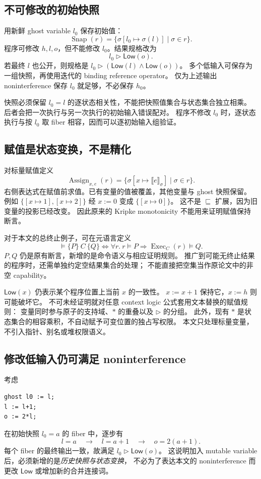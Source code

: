\documentclass[UTF8,a4paper,11pt,fontset=fandol]{ctexart}
\newcommand{\Low}{\mathsf{Low}}
\newcommand{\Exec}{\operatorname{Exec}}
\newcommand{\sat}{\models}
\newcommand{\eqv}{\Longleftrightarrow}
\begin{document}
\subsection{不可修改的初始快照}
用新鲜 ghost variable $l_0$ 保存初始值：
\[
 \operatorname{Snap}(r)=
 \{\sigma[l_0\mapsto\sigma(l)]\mid\sigma\in r\}.
\]
程序可修改 $h,l,o$，但不能修改 $l_0$。结果规格改为
\[
 \boxed{l_0\triangleright\Low(o).}
\]
若最终 $l$ 也公开，则规格是
$l_0\triangleright(\Low(l)\land\Low(o))$。
多个低输入可保存为一组快照，再使用迭代的 binding reference operator。
仅为上述输出 noninterference 保存 $l_0$ 就足够，不必保存 $h_0$。

快照必须保留 $l_0=l$ 的逐状态相关性，不能把快照值集合与状态集合独立相乘。
后者会把一次执行与另一次执行的初始输入错误配对。
程序不修改 $l_0$ 时，逐状态执行与按 $l_0$ 取 fiber 相容，因而可以逐初始输入组验证。

\subsection{赋值是状态变换，不是精化}
对标量赋值定义
\[
 \operatorname{Assign}_{x,e}(r)=
 \{\sigma[x\mapsto\llbracket e\rrbracket_\sigma]\mid\sigma\in r\}.
\]
右侧表达式在赋值前求值。已有变量的值被覆盖，其他变量与 ghost 快照保留。
例如 $\{[x\mapsto1],[x\mapsto2]\}$ 经 $x:=0$ 变成 $\{[x\mapsto0]\}$。
这不是 $\sqsubseteq$ 扩展，因为旧变量的投影已经改变。
因此原来的 Kripke monotonicity 不能用来证明赋值保持断言。

对于本文的总终止例子，可在元语言定义
\[
 \sat\{P\}\ C\ \{Q\}
 \eqv
 \forall r.\ r\sat P\Longrightarrow\Exec_C(r)\sat Q.
\]
$P,Q$ 仍是原有断言，新增的是命令语义与相应证明规则。
推广到可能无终止结果的程序时，还需单独约定空结果集合的处理；
不能直接把空集当作原论文中的非空 capability。

$\Low(x)$ 仍表示某个程序位置上当前 $x$ 的一致性。
$x:=x+1$ 保持它，$x:=h$ 则可能破坏它。
不可未经证明就对任意 context logic 公式套用文本替换的赋值规则：
变量同时参与原子的支持域、$*$ 的重叠以及 $\triangleright$ 的分组。
此外，现有 $*$ 是状态集合的相容乘积，不自动赋予可变位置的独占写权限。
本文只处理标量变量，不引入指针、别名或堆权限语义。

\subsection{修改低输入仍可满足 noninterference}
考虑
\begin{verbatim}
ghost l0 := l;
l := l+1;
o := 2*l;
\end{verbatim}
在初始快照 $l_0=a$ 的 fiber 中，逐步有
\[
 l=a\quad\longrightarrow\quad l=a+1
 \quad\longrightarrow\quad o=2(a+1).
\]
每个 fiber 的最终输出一致，故满足 $l_0\triangleright\Low(o)$。
这说明加入 mutable variable 后，必须新增的是\emph{历史快照与状态变换}，
不必为了表达本文的 noninterference 而更改 $\Low$ 或增加新的合并连接词。
\end{document}
